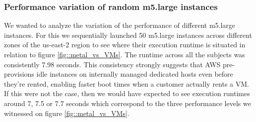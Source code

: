 \subsubsection{Performance variation of random m5.large instances}
We wanted to analyze the variation of the performance of different m5.large instances. For this we 
sequentially launched 50 m5.large instances across different zones of the us-east-2 region to see where their 
execution runtime is situated in relation to figure \ref{fig::metal_vs_VMs}. The runtime across all the subjects
was consistently 7.98 seconds. This consistency strongly suggests that AWS pre-provisions idle instances on 
internally managed dedicated hosts even before they're rented, enabling faster boot times 
when a customer actually rents a VM. If this were not the case, then we would have expected to see 
execution runtimes around  7, 7.5 or 7.7 seconds which correspond to the three performance 
levels we witnessed on figure \ref{fig::metal_vs_VMs}. 

